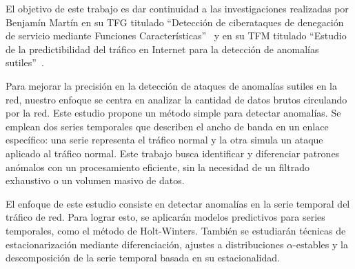 El objetivo de este trabajo es dar continuidad a las investigaciones realizadas por Benjamín Martín en su
\ac{TFG} titulado ``Detección de ciberataques de denegación de servicio mediante Funciones Características''~\cite{benjamin2021}
y en su \ac{TFM} titulado ``Estudio de la predictibilidad del tráfico en Internet para la detección de anomalías sutiles''~\cite{benjamin2023}.

Para mejorar la precisión en la detección de ataques de anomalías sutiles en la red, nuestro enfoque se centra en analizar la cantidad de datos brutos circulando por la red. Este estudio propone un método simple para detectar anomalías. Se emplean dos series temporales que describen el ancho de banda en un enlace específico: una serie representa el tráfico normal y la otra simula un ataque aplicado al tráfico normal.
Este trabajo busca identificar y diferenciar patrones anómalos con un procesamiento eficiente, sin la necesidad de un filtrado exhaustivo o un volumen masivo de datos.

El enfoque de este estudio consiste en detectar anomalías en la serie temporal del tráfico de red.
Para lograr esto, se aplicarán modelos predictivos para series temporales, 
como el método de Holt-Winters. También se estudiarán técnicas de estacionarización mediante diferenciación,
ajustes a distribuciones $\alpha$-estables y la descomposición de la serie temporal basada en su estacionalidad.